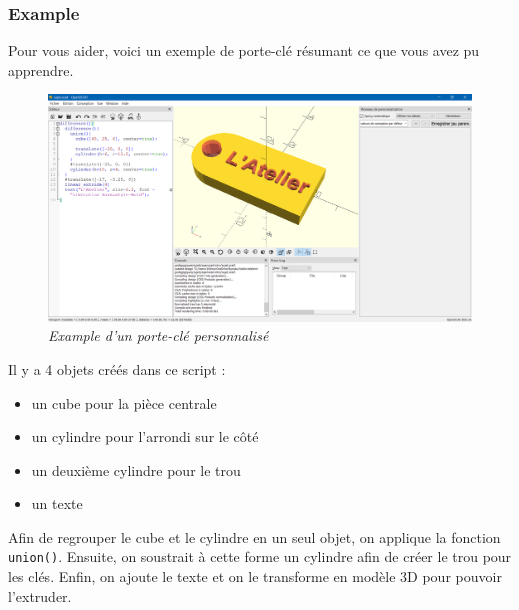 \subsubsection{Example}

Pour vous aider, voici un exemple de porte-clé résumant ce que vous avez pu apprendre.

\begin{figure}[ht]
	\centering
	\includegraphics[width=12cm]{images/example}
	\caption{\textit{Example d'un porte-clé personnalisé}}
\end{figure}


Il y a 4 objets créés dans ce script :

\begin{itemize}
	\item un cube pour la pièce centrale
	\item un cylindre pour l'arrondi sur le côté
	\item un deuxième cylindre pour le trou
	\item un texte
\end{itemize}

Afin de regrouper le cube et le cylindre en un seul objet, on applique la fonction \verb|union()|.
Ensuite, on soustrait à cette forme un cylindre afin de créer le trou pour les clés.
Enfin, on ajoute le texte et on le transforme en modèle 3D pour pouvoir l'extruder.


